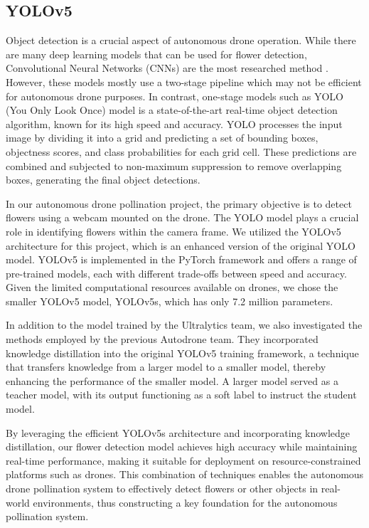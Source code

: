 \subsection{YOLOv5}\label{subsection:C}

Object detection is a crucial aspect of autonomous drone operation. While there are many deep learning models that can be used for flower detection, Convolutional Neural Networks (CNNs) are the most researched method \cite{b5, b6}. However, these models mostly use a two-stage pipeline which may not be efficient for autonomous drone purposes. In contrast, one-stage models such as YOLO (You Only Look Once) \cite{b7} model is a state-of-the-art real-time object detection algorithm, known for its high speed and accuracy. YOLO processes the input image by dividing it into a grid and predicting a set of bounding boxes, objectness scores, and class probabilities for each grid cell. These predictions are combined and subjected to non-maximum suppression to remove overlapping boxes, generating the final object detections.

In our autonomous drone pollination project, the primary objective is to detect flowers using a webcam mounted on the drone. The YOLO model plays a crucial role in identifying flowers within the camera frame. We utilized the YOLOv5 architecture \cite{b8} for this project, which is an enhanced version of the original YOLO model. YOLOv5 is implemented in the PyTorch framework and offers a range of pre-trained models, each with different trade-offs between speed and accuracy. Given the limited computational resources available on drones, we chose the smaller YOLOv5 model, YOLOv5s, which has only 7.2 million parameters.

In addition to the model trained by the Ultralytics team, we also investigated the methods employed by the previous Autodrone team. They incorporated knowledge distillation \cite{b9} into the original YOLOv5 training framework, a technique that transfers knowledge from a larger model to a smaller model, thereby enhancing the performance of the smaller model. A larger model served as a teacher model, with its output functioning as a soft label to instruct the student model.

By leveraging the efficient YOLOv5s architecture and incorporating knowledge distillation, our flower detection model achieves high accuracy while maintaining real-time performance, making it suitable for deployment on resource-constrained platforms such as drones. This combination of techniques enables the autonomous drone pollination system to effectively detect flowers or other objects in real-world environments, thus constructing a key foundation for the autonomous pollination system.

